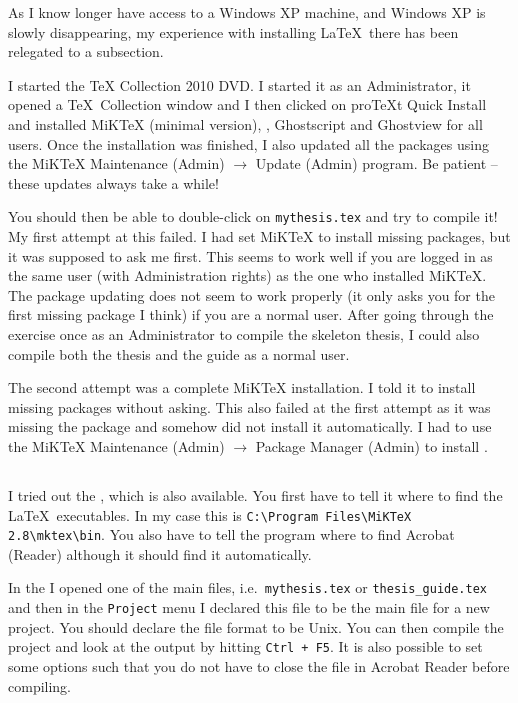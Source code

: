 As I know longer have access to a Windows XP machine, and Windows XP is
slowly disappearing, my experience with installing \LaTeX\ there has
been relegated to a subsection.

I started the \TeX{} Collection 2010 DVD. I started it as an
Administrator, it opened a \TeX\ Collection window and I then clicked
on proTeXt Quick Install and installed MiK\TeX{} (minimal
version), \TeXnicCenter,
Ghostscript and Ghostview for all users. Once the installation was
finished, I also updated all the packages using the MiK\TeX{}
Maintenance (Admin) $\to$ Update (Admin) program. Be patient -- these
updates always take a while!

You should then be able to double-click on \texttt{mythesis.tex} and
try to compile it! My first attempt at this failed. I had set
MiK\TeX{} to install missing packages, but it was supposed to ask me
first. This seems to work well if you are logged in as the same user
(with Administration rights) as the one who installed MiK\TeX. The
package updating does not seem to work properly (it only asks you for
the first missing package I think) if you are a normal user. After
going through the exercise once as an Administrator to compile the
skeleton thesis, I could also compile both the thesis and the guide as
a normal user.

The second attempt was a complete MiK\TeX{} installation. I told it to
install missing packages without asking. This also failed at the first
attempt as it was missing the package  and somehow did
not install it automatically. I had to use the MiK\TeX{} Maintenance
(Admin) $\to$ Package Manager (Admin) to install .


\subsection{\TeXnicCenter}
\label{sec:app:texnic}

I tried out the \TeXnicCenter, which is also available. You first
have to tell it where to find the \LaTeX\ executables. In my case
this is \texttt{C:\textbackslash Program Files\textbackslash MiKTeX
  2.8\textbackslash mktex\textbackslash bin}. You also have to tell
the program where to find Acrobat (Reader) although it should find it
automatically.

In the \TeXnicCenter I opened one of the main files, i.e.\
\texttt{mythesis.tex} or \texttt{thesis\_guide.tex} and then in the
\texttt{Project} menu I declared this file to be the main file for a
new project. You should declare the file format to be Unix. You can
then compile the project and look at the output by hitting
\texttt{Ctrl + F5}. It is also possible to set some options such that
you do not have to close the file in Acrobat Reader before compiling.

